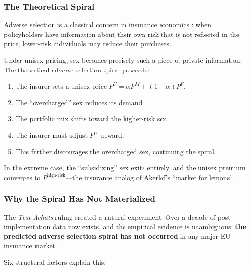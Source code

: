 \documentclass[12pt,a4paper]{article}
\begin{document}
\subsubsection{The Theoretical Spiral}

Adverse selection is a classical concern in insurance economics \cite{rothschild1976}: when policyholders have information about their own risk that is not reflected in the price, lower-risk individuals may reduce their purchases.

Under unisex pricing, sex becomes precisely such a piece of private information. The theoretical adverse selection spiral proceeds:

\begin{enumerate}
  \item The insurer sets a unisex price $P^U = \alpha P^M + (1-\alpha) P^F$.
  \item The ``overcharged'' sex reduces its demand.
  \item The portfolio mix shifts toward the higher-risk sex.
  \item The insurer must adjust $P^U$ upward.
  \item This further discourages the overcharged sex, continuing the spiral.
\end{enumerate}

In the extreme case, the ``subsidizing'' sex exits entirely, and the unisex premium converges to $P^{\text{high-risk}}$---the insurance analog of Akerlof's ``market for lemons'' \cite{akerlof1970}.

\subsubsection{Why the Spiral Has Not Materialized}

The \emph{Test-Achats} ruling created a natural experiment. Over a decade of
post-implementation data now exists, and the empirical evidence is
unambiguous: \textbf{the predicted adverse selection spiral has not occurred}
in any major EU insurance market
\cite{aseervatham2016, schmeiser2014}.

Six structural factors explain this:
\end{document}
